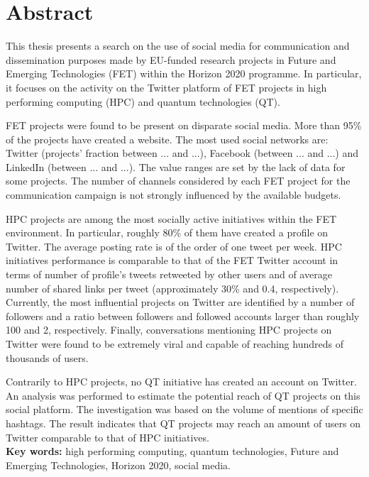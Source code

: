 \chapter*{Abstract}
This thesis presents a search on the use of social media for communication and dissemination purposes made by EU-funded research projects in Future and Emerging Technologies (FET) within the Horizon 2020 programme. In particular, it focuses on the activity on the Twitter platform of FET projects in high performing computing (HPC) and quantum technologies (QT).

FET projects were found to be present on disparate social media. More than 95\% of the projects have created a website. The most used social networks are: Twitter (projects' fraction between ... and ...), Facebook (between ... and ...) and LinkedIn (between ... and ...). The value ranges are set by the lack of data for some projects. The number of channels considered by each FET project for the communication campaign is not strongly influenced by the available budgets.

HPC projects are among the most socially active initiatives within the FET environment. In particular, roughly 80\% of them have created a profile on Twitter. The average posting rate is of the order of one tweet per week. HPC initiatives performance is comparable to that of the FET Twitter account in terms of number of profile's tweets retweeted by other users and of average number of shared links per tweet (approximately 30\% and 0.4, respectively). Currently, the most influential projects on Twitter are identified by a number of followers and a ratio between followers and followed accounts larger than roughly 100 and 2, respectively. Finally, conversations mentioning HPC projects on Twitter were found to be extremely viral and capable of reaching hundreds of thousands of users.

Contrarily to HPC projects, no QT initiative has created an account on Twitter. An analysis was performed to estimate the potential reach of QT projects on this social platform. The investigation was based on the volume of mentions of specific hashtags. The result indicates that QT projects may reach an amount of users on Twitter comparable to that of HPC initiatives. \\

\noindent
\textbf{Key words:} high performing computing, quantum technologies, Future and Emerging Technologies, Horizon 2020, social media.